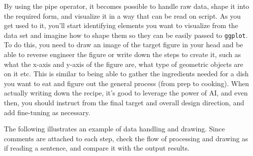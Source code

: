 \documentclass[
  a4paper,
]{book}
\begin{document}
By using the pipe operator, it becomes possible to handle raw data,
shape it into the required form, and visualize it in a way that can be
read on script. As you get used to it, you'll start identifying elements
you want to visualize from the data set and imagine how to shape them so
they can be easily passed to \texttt{ggplot}. To do this, you need to
draw an image of the target figure in your head and be able to reverse
engineer the figure or write down the steps to create it, such as what
the x-axis and y-axis of the figure are, what type of geometric objects
are on it etc. This is similar to being able to gather the ingredients
needed for a dish you want to eat and figure out the general process
(from prep to cooking). When actually writing down the recipe, it's good
to leverage the power of AI, and even then, you should instruct from the
final target and overall design direction, and add fine-tuning as
necessary.

The following illustrates an example of data handling and drawing. Since
comments are attached to each step, check the flow of processing and
drawing as if reading a sentence, and compare it with the output
results.
\end{document}
